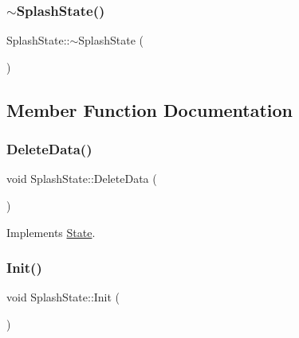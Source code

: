 \mbox{\label{classSplashState_a3171ebc16024564fced18948bf9d7ec5}} 
\subsubsection{\texorpdfstring{$\sim$\+Splash\+State()}{~SplashState()}}
{\footnotesize\ttfamily Splash\+State\+::$\sim$\+Splash\+State (\begin{DoxyParamCaption}{ }\end{DoxyParamCaption})\hspace{0.3cm}{\ttfamily [private]}}



\subsection{Member Function Documentation}
\mbox{\label{classSplashState_aca842c8e3ea2642980569ed3b4bb362a}} 
\subsubsection{\texorpdfstring{Delete\+Data()}{DeleteData()}}
{\footnotesize\ttfamily void Splash\+State\+::\+Delete\+Data (\begin{DoxyParamCaption}{ }\end{DoxyParamCaption})\hspace{0.3cm}{\ttfamily [virtual]}}



Implements \hyperlink{classState_ade502eaa386d570e526eb356ffd73fd8}{State}.

\mbox{\label{classSplashState_ae3e0604da087032c179593c237580988}} 
\subsubsection{\texorpdfstring{Init()}{Init()}}
{\footnotesize\ttfamily void Splash\+State\+::\+Init (\begin{DoxyParamCaption}{ }\end{DoxyParamCaption})\hspace{0.3cm}{\ttfamily [virtual]}}



